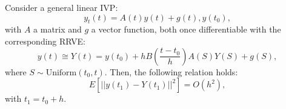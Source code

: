 \documentclass[a4paper,12pt]{article}
\begin{document}
\begin{conjecture}
  Consider a general linear IVP:
  \begin{equation}
    y_{t}(t)= A(t)y(t)+g(t), y(t_{0}),
  \end{equation}
  with $A$ a matrix and $g$ a vector function, both
  once differentiable with the corresponding RRVE:
  \begin{equation}
    y(t) \cong Y(t) = y(t_{0}) + h B \left( \frac{t-t_{0}}{h}\right)
    A(S) Y(S) + g(S),
  \end{equation}
  where $S \sim \text{Uniform}(t_{0},t)$. Then, the following relation holds:
  \begin{equation}
    E[||y(t_{1})-Y(t_{1})||^{2}] = O(h^{2}),
  \end{equation}
  with $t_{1} = t_{0} + h$.
\end{conjecture}
\end{document}
